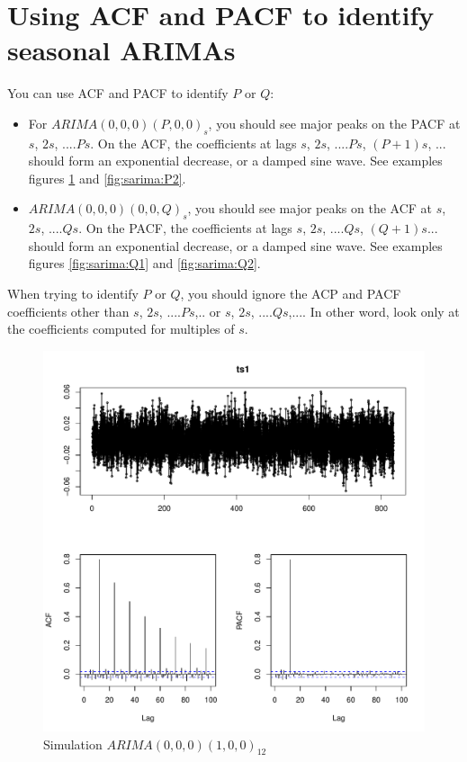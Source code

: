 \documentclass[a4paper,11pt,oneside,onecolumn]{book}
\begin{document}
\section{Using ACF and PACF to identify  seasonal ARIMAs}

You can use ACF and PACF to identify $P$ or $Q$: 
\begin{itemize}
\item For $ARIMA(0,0,0)(P,0,0)_s$, you should see major peaks on the PACF at $s$, $2s$, ....$Ps$. On the ACF, the coefficients at lags $s$, $2s$, ....$Ps$, $(P+1)s$, ... should form an exponential decrease, or a damped sine wave.
See examples figures \ref{fig:sarima:P1} and \ref{fig:sarima:P2}.
\item $ARIMA(0,0,0)(0,0,Q)_s$, you should see major peaks on the ACF at $s$, $2s$, ....$Qs$. On the PACF, the coefficients at lags $s$, $2s$, ....$Qs$, $(Q+1)s$... should form an exponential decrease, or a damped sine wave.
See examples figures \ref{fig:sarima:Q1} and \ref{fig:sarima:Q2}.
\end{itemize}
When trying to identify   $P$ or $Q$, you should ignore the ACP and PACF coefficients other than $s$, $2s$, ....$Ps$,..  or $s$, $2s$, ....$Qs$,....
In other word, look only at the coefficients computed for multiples of $s$.  

\begin{figure}[!h]
\begin{center}
\includegraphics[width=.7\linewidth]{ SARP1.pdf}
\caption{Simulation $ARIMA(0,0,0)(1,0,0)_{12}$}\label{fig:sarima:P1}
\end{center}
\end{figure}
\end{document}
